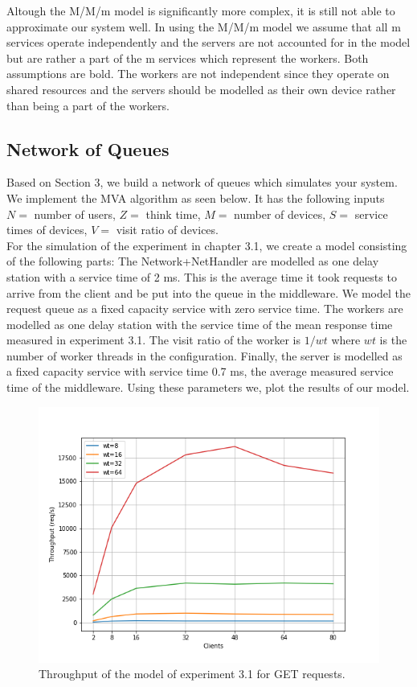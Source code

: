 \documentclass[11pt,a4paper]{article}
\begin{document}
Altough the M/M/m model is significantly more complex, it is still not able to approximate our system well. In using the M/M/m model we assume that all m services operate independently and the servers are not accounted for in the model but are rather a part of the m services which represent the workers. Both assumptions are bold. The workers are not independent since they operate on shared resources and the servers should be modelled as their own device rather than being a part of the workers.

\subsection{Network of Queues}

Based on Section 3, we build a network of queues which simulates your system. We implement the MVA algorithm as seen below. It has the following inputs $N=$ number of users, $Z=$ think time, $M=$ number of devices, $S=$ service times of devices, $V=$ visit ratio of devices.\\

For the simulation of the experiment in chapter 3.1, we create a model consisting of the following parts: The Network+NetHandler are modelled as one delay station with a service time of 2 ms. This is the average time it took requests to arrive from the client and be put into the queue in the middleware. We model the request queue as a fixed capacity service with zero service time. The workers are modelled as one delay station with the service time of the mean response time measured in experiment 3.1. The visit ratio of the worker is $1/wt$ where $wt$ is the number of worker threads in the configuration. Finally, the server is modelled as a fixed capacity service with service time 0.7 ms, the average measured service time of the middleware. Using these parameters we, plot the results of our model.

\begin{figure}
\centering
\includegraphics[width=.8\textwidth]{71/71_31get.png}
\caption{Throughput of the model of experiment 3.1 for GET requests.}
\label{fig:71_get}
\end{figure}
\end{document}
